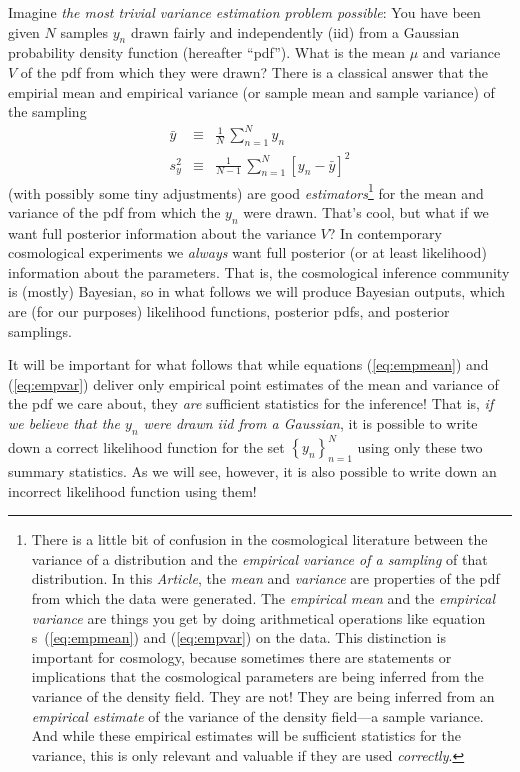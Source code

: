 \documentclass[12pt, letterpaper, preprint]{aastex}
\newcommand{\setof}[1]{\left\{{#1}\right\}}
\newcommand{\documentname}{\textsl{Article}}
\newcommand{\equationname}{equation}
\begin{document}
Imagine \emph{the most trivial variance estimation problem possible}:
You have been given $N$ samples $y_n$ drawn fairly and independently (iid)
from a Gaussian probability density function (hereafter ``pdf'').
What is the mean $\mu$ and variance $V$ of the pdf from which they
were drawn?
There is a classical answer that the empirial mean and empirical
variance (or sample mean and sample variance) of the sampling
\begin{eqnarray}
\bar{y} &\equiv& \frac{1}{N}\,\sum_{n=1}^N y_n
\label{eq:empmean}\\
s^2_y &\equiv& \frac{1}{N-1}\,\sum_{n=1}^N [y_n - \bar{y}]^2
\label{eq:empvar}
\end{eqnarray}
(with possibly some tiny adjustments) are good
\emph{estimators}\footnote{There is a little bit of confusion in the
  cosmological literature between the variance of a distribution and
  the \emph{empirical variance of a sampling} of that distribution. In this
  \documentname, the \emph{mean} and \emph{variance} are properties of
  the pdf from which the data were generated. The \emph{empirical
    mean} and the \emph{empirical variance} are things you get by
  doing arithmetical operations like \equationname
  s~(\ref{eq:empmean}) and (\ref{eq:empvar}) on the data.  This
  distinction is important for cosmology, because sometimes there are
  statements or implications that the cosmological parameters are
  being inferred from the variance of the density field. They are not!
  They are being inferred from an \emph{empirical estimate} of the
  variance of the density field---a sample variance. And while these empirical estimates
  will be sufficient statistics for the variance,
  this is only relevant and valuable if
  they are used \emph{correctly}.} for the mean and variance of the
pdf from which the $y_n$ were drawn.
That's cool, but what if we want full posterior information about the
variance $V$?
In contemporary cosmological experiments we \emph{always} want full
posterior (or at least likelihood) information about the parameters.
That is, the cosmological inference community is (mostly) Bayesian,
so in what follows we will produce Bayesian outputs, which are (for
our purposes) likelihood functions, posterior pdfs, and posterior
samplings.

It will be important for what follows that while equations
(\ref{eq:empmean}) and (\ref{eq:empvar}) deliver only empirical
point estimates of the mean and variance of the pdf we care about,
they \emph{are} sufficient statistics for the inference!
That is, \emph{if we believe that the $y_n$ were drawn iid from a
  Gaussian}, it is possible to write down a correct likelihood
function for the set $\setof{y_n}_{n=1}^N$ using only these two
summary statistics.
As we will see, however, it is also possible to write down an
incorrect likelihood function using them!
\end{document}
